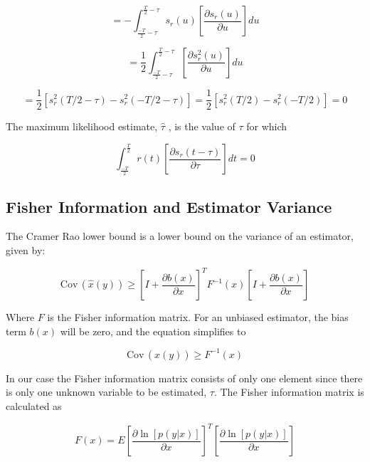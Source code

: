 \documentclass[11pt]{article}
\def\Cov{{\textrm{Cov}}\,}
\begin{document}
\begin{equation}
=-\int^{\frac{T}{2}-\tau}_{\frac{-T}{2}-\tau}
s_r(u)
\left[ \frac{\partial s_r(u)}{\partial u} \right] du
\end{equation}

\begin{equation}
=\frac{1}{2} \int^{\frac{T}{2}-\tau}_{\frac{-T}{2}-\tau}
\left[ \frac{\partial s_r^2(u)}{\partial u} \right] du
\end{equation}

\begin{equation}
=\frac{1}{2}[s_r^2(T/2-\tau) - s_r^2(-T/2-\tau)] = \frac{1}{2}[s_r^2(T/2) - s_r^2(-T/2)] = 0
\end{equation}

The maximum likelihood estimate, $\hat{\tau}$ , is the value of $\tau$ for which

\begin{equation}
\int^\frac{T}{2}_\frac{-T}{2}
r(t)
\left[ \frac{\partial s_r(t-\tau)}{\partial \tau} \right] dt = 0
\end{equation}


\subsection{Fisher Information and Estimator Variance}


The Cramer Rao lower bound is a lower bound on the variance of an estimator, given by:

\begin{equation}
\Cov(\hat{x}(y))
\geq
\left[I + \frac{\partial b(x)}{\partial x}\right]^T F^{-1}(x) \left[I + \frac{\partial b(x)}{\partial x}\right]
\end{equation}

Where $F$ is the Fisher information matrix. For an unbiased estimator, the bias term $b(x)$ will be zero, and the equation simplifies to

\begin{equation}
\Cov(\hat{x}(y))
\geq
F^{-1}(x)
\end{equation}

In our case the Fisher information matrix consists of only one element since there is only one unknown variable to be estimated, $\tau$. The Fisher information matrix is calculated as

\begin{equation}
F(x) = E\left[ \frac{\partial \ln [p(y|x)]}{\partial x} \right]^T
\left[ \frac{\partial \ln [p(y|x)]}{\partial x} \right]
\end{equation}
\end{document}
